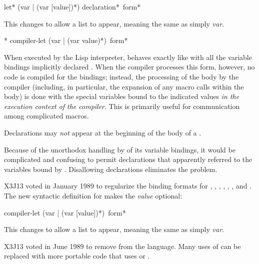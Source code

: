 \begin{defspec}
\begin{new}
\begin{defmac}
let* ({var | (var [value])}*) {declaration}* {\,form}*

This changes  to allow a list  to appear,
meaning the same as simply {\it var}.
\end{defmac}
\end{new}
\end{defspec}

\begin{obsolete}
\begin{defspec}*
compiler-let ({var | (var value)}*) {\,form}*

When executed by the Lisp interpreter,  behaves
exactly like  with all the variable bindings implicitly
declared .  When the compiler processes this form,
however, no code is compiled for the bindings;
instead, the processing of the body by the compiler
(including, in particular, the expansion of any macro calls
within the body) is done with
the special variables bound to the indicated values {\it in the
execution context of the compiler}.  This is primarily useful for
communication among complicated macros.

Declarations may {\it not} appear at the beginning of the body
of a .

\beforenoterule
\begin{rationale}
Because of the unorthodox
handling by  of its variable bindings,
it would be complicated and confusing to permit declarations
that apparently referred to the variables bound by .
Disallowing declarations eliminates the problem.
\end{rationale}
\afternoterule

X3J13 voted in January 1989
to regularize the binding formats for , , ,
, , , and .
The new syntactic definition for  makes the {\it value} optional:

\begin{defmac}
compiler-let ({var | (var [value])}*) {\,form}*

This changes  to allow a list  to appear,
meaning the same as simply {\it var}.
\end{defmac}
\end{defspec}
\end{obsolete}

\begin{newer}
X3J13 voted in June 1989  to remove
 from the language.  Many uses of 
can be replaced with more portable code that uses 
or .
\end{newer}

